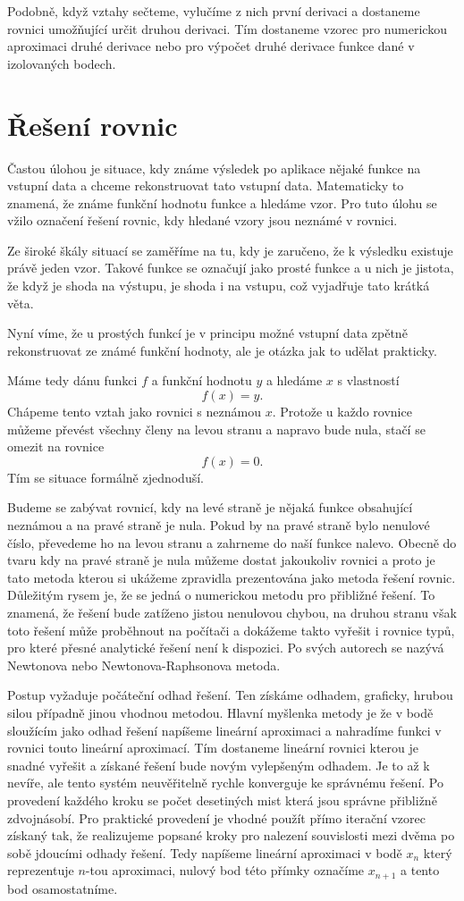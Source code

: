 \documentclass[12pt]{article}
\begin{document}
Podobně, když vztahy sečteme, vylučíme z nich první derivaci a dostaneme rovnici umožňující určit druhou derivaci. Tím dostaneme vzorec pro numerickou aproximaci druhé derivace nebo pro výpočet druhé derivace funkce dané v izolovaných bodech.

\section*{Řešení rovnic}

Častou úlohou je situace, kdy známe výsledek po aplikace nějaké funkce na vstupní data a chceme rekonstruovat tato vstupní data. Matematicky to znamená, že známe funkční hodnotu funkce a hledáme vzor. Pro tuto úlohu se vžilo označení řešení rovnic, kdy hledané vzory jsou neznámé v rovnici.

Ze široké škály situací se zaměříme na tu, kdy je zaručeno, že k výsledku existuje právě jeden vzor. Takové funkce se označují jako prosté funkce a u nich je jistota, že když je shoda na výstupu, je shoda i na vstupu, což vyjadřuje tato krátká věta.

Nyní víme, že u prostých funkcí je v principu možné vstupní data zpětně rekonstruovat ze známé funkční hodnoty, ale je otázka jak to udělat prakticky.

Máme tedy dánu funkci $f$ a funkční hodnotu $y$ a hledáme $x$ s vlastností $$f(x)=y.$$ Chápeme tento vztah jako rovnici s neznámou $x$. Protože u každo rovnice můžeme převést všechny členy na levou stranu a napravo bude nula, stačí se omezit na rovnice $$f(x)=0.$$ Tím se situace formálně zjednoduší.

Budeme se zabývat rovnicí, kdy na levé straně je nějaká funkce obsahující neznámou a na pravé straně je nula. Pokud by na pravé straně bylo nenulové číslo, převedeme ho na levou stranu a zahrneme do naší funkce nalevo. Obecně do tvaru kdy na pravé straně je nula můžeme dostat jakoukoliv rovnici a proto je tato metoda kterou si ukážeme zpravidla prezentována jako metoda řešení rovnic. Důležitým rysem je, že se jedná o numerickou metodu pro přibližné řešení. To znamená, že řešení bude zatíženo jistou nenulovou chybou, na druhou stranu však toto řešení může proběhnout na počítači a dokážeme takto vyřešit i rovnice typů, pro které přesné analytické řešení není k dispozici. Po svých autorech se nazývá Newtonova nebo Newtonova-Raphsonova metoda.

Postup vyžaduje počáteční odhad řešení. Ten získáme odhadem, graficky, hrubou silou případně jinou vhodnou metodou. Hlavní myšlenka metody je že v bodě sloužícím jako odhad řešení napíšeme lineární aproximaci a nahradíme funkci v rovnici touto lineární aproximací. Tím dostaneme lineární rovnici kterou je snadné vyřešit a získané řešení bude novým vylepšeným odhadem. Je to až k nevíře, ale tento systém neuvěřitelně rychle konverguje ke správnému řešení. Po provedení každého kroku se počet desetiných mist která jsou správne přibližně zdvojnásobí. Pro praktické provedení je vhodné použít přímo iterační vzorec získaný tak, že realizujeme popsané kroky pro nalezení souvislosti mezi dvěma po sobě jdoucími odhady řešení. Tedy napíšeme lineární aproximaci v bodě $x_n$ který reprezentuje $n$-tou aproximaci, nulový bod této přímky označíme $x_{n+1}$ a tento bod osamostatníme.
\end{document}
